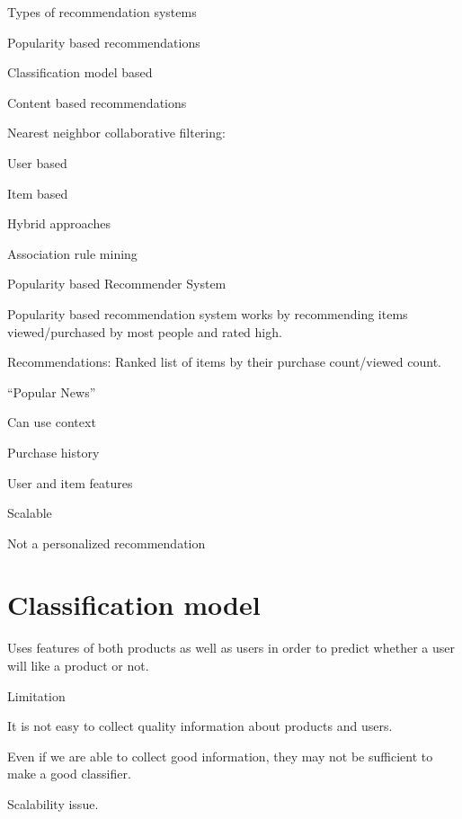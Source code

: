 Types of recommendation systems
	\begin{bulletedlist}
		\item Popularity based recommendations
		\item Classification model based
		\item Content based recommendations
		\item Nearest neighbor collaborative filtering:
		\begin{bulletedlist}
			\item User based
			\item Item based
		\end{bulletedlist}
		\item Hybrid approaches
		\item Association rule mining
	\end{bulletedlist}

Popularity based Recommender System
	\begin{bulletedlist}
		\item Popularity based recommendation system works by recommending items viewed/pur\-chased by most people and rated high.
		\item Recommendations: Ranked list of items by their purchase count/viewed count.
		\item``Popular News''
		\begin{bulletedlist}
			\item Can use context
			\item Purchase history
			\item User and item features
			\item Scalable
		\end{bulletedlist}
		\item Not a personalized recommendation
	\end{bulletedlist}

	\section{Classification model}
	\begin{bulletedlist}
		\item Uses features of both products as well as users in order to predict whether a user will like a product or not.
		\item Limitation
		\begin{numberedlist}
			\item It is not easy to collect quality information about products and users.
			\item Even if we are able to collect good information, they may not be sufficient to make a good classifier.
			\item Scalability issue.
		\end{numberedlist}
	\end{bulletedlist}

